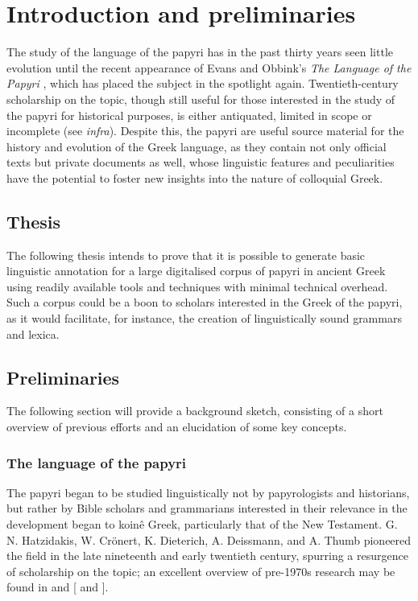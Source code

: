 \chapter{Introduction and preliminaries}
\label{chp:introduction}

The study of the language of the papyri has in the past thirty years
seen little evolution until the recent appearance of Evans and Obbink's
\textit{The Language of the Papyri} \citep{lpapyri}, which has placed
the subject in the spotlight again. Twentieth-century scholarship on the
topic, though still useful for those interested in the study of the
papyri for historical purposes, is either antiquated, limited in scope
or incomplete (see \textit{infra}). Despite this, the papyri are
useful source material for the history and evolution of the Greek
language, as they contain not only official texts but private
documents as well, whose linguistic features and peculiarities have the
potential to foster new insights into the nature of colloquial Greek. 

\section{Thesis}
The following thesis intends to prove that it is possible to generate
basic linguistic annotation for a large digitalised corpus of papyri in
ancient Greek using readily available tools and techniques with minimal
technical overhead. Such a corpus could be  a boon to scholars interested
in the Greek of the papyri, as it would facilitate, for instance, the
creation of linguistically sound grammars and lexica.

\section{Preliminaries}

The following section will provide a background sketch, consisting of a short
overview of previous efforts and an elucidation of some key concepts.

\subsection{The language of the papyri}

The papyri began to be studied linguistically not by papyrologists and
historians, but rather by Bible scholars and grammarians interested in their
relevance in the development began to koin\^{e} Greek, particularly that of the
New Testament. G. N.  Hatzidakis, W. Cr\"onert, K. Dieterich, A. Deissmann, and
A.  Thumb pioneered the field in the late nineteenth and early twentieth
century, spurring a resurgence of scholarship on the topic; an excellent
overview of pre-1970s research may be found in \citet{mandilaras1973} and
\citeauthor{gignac1976} [\citeyear{gignac1976} and \citeyear{gignac1981}].

